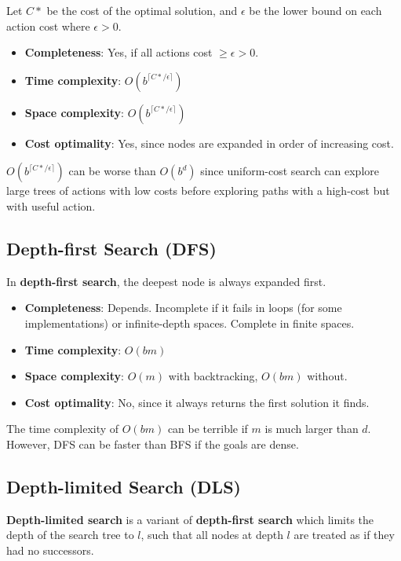 Let $C*$ be the cost of the optimal solution, and $\epsilon$ be the lower bound on each action cost where $\epsilon > 0$.

\begin{itemize}
    \item \textbf{Completeness}: Yes, if all actions cost $\ge \epsilon > 0$.
    \item \textbf{Time complexity}: $O(b^{\lceil C* / \epsilon \rceil})$
    \item \textbf{Space complexity}: $O(b^{\lceil C* / \epsilon \rceil})$
    \item \textbf{Cost optimality}: Yes, since nodes are expanded in order of increasing cost.
\end{itemize}

$O(b^{\lceil C* / \epsilon \rceil})$ can be worse than $O(b^d)$ since uniform-cost search can explore large trees of actions with low costs before exploring paths with a high-cost but with useful action.


\subsection{Depth-first Search (DFS)}

In \textbf{depth-first search}, the deepest node is always expanded first.

\begin{itemize}
    \item \textbf{Completeness}: Depends. Incomplete if it fails in loops (for some implementations) or infinite-depth spaces. Complete in finite spaces.
    \item \textbf{Time complexity}: $O(bm)$
    \item \textbf{Space complexity}: $O(m)$ with backtracking, $O(bm)$ without.
    \item \textbf{Cost optimality}: No, since it always returns the first solution it finds.
\end{itemize}

The time complexity of $O(bm)$ can be terrible if $m$ is much larger than $d$. However, DFS can be faster than BFS if the goals are dense.


\subsection{Depth-limited Search (DLS)}

\textbf{Depth-limited search} is a variant of \textbf{depth-first search} which limits the depth of the search tree to $l$, such that all nodes at depth $l$ are treated as if they had no successors.

